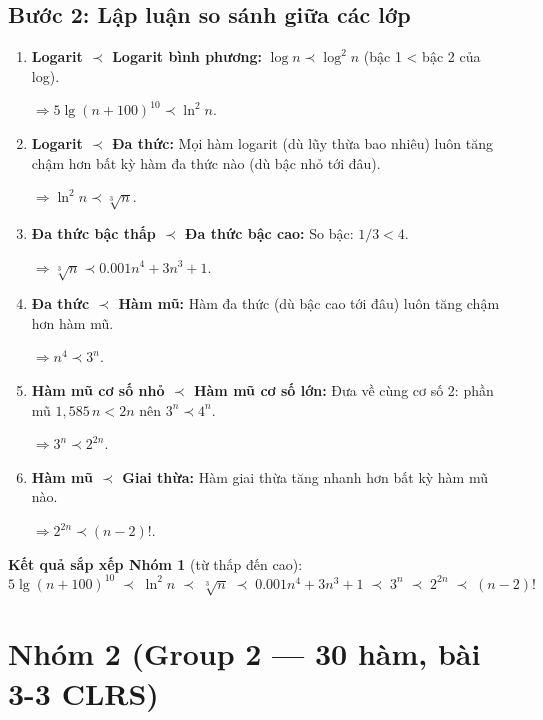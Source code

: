 ﻿\documentclass[12pt,a4paper]{article}
\begin{document}
\subsection{Bước 2: Lập luận so sánh giữa các lớp}

\begin{enumerate}[label=\textbf{(\alph*)}]
  \item \textbf{Logarit $\prec$ Logarit bình phương:}
    $\log n \prec \log^2 n$ (bậc 1 < bậc 2 của log).

    $\Rightarrow 5\lg(n+100)^{10} \prec \ln^2 n$.

  \item \textbf{Logarit $\prec$ Đa thức:}
    Mọi hàm logarit (dù lũy thừa bao nhiêu) luôn tăng chậm hơn bất kỳ hàm đa thức nào (dù bậc nhỏ tới đâu).

    $\Rightarrow \ln^2 n \prec \sqrt[3]{n}$.

  \item \textbf{Đa thức bậc thấp $\prec$ Đa thức bậc cao:}
    So bậc: $1/3 < 4$.

    $\Rightarrow \sqrt[3]{n} \prec 0.001n^4 + 3n^3 + 1$.

  \item \textbf{Đa thức $\prec$ Hàm mũ:}
    Hàm đa thức (dù bậc cao tới đâu) luôn tăng chậm hơn hàm mũ.

    $\Rightarrow n^4 \prec 3^n$.

  \item \textbf{Hàm mũ cơ số nhỏ $\prec$ Hàm mũ cơ số lớn:}
    Đưa về cùng cơ số 2: phần mũ $1{,}585\,n < 2n$ nên $3^n \prec 4^n$.

    $\Rightarrow 3^n \prec 2^{2n}$.

  \item \textbf{Hàm mũ $\prec$ Giai thừa:}
    Hàm giai thừa tăng nhanh hơn bất kỳ hàm mũ nào.

    $\Rightarrow 2^{2n} \prec (n-2)!$.
\end{enumerate}

\begin{resultbox}
\textbf{Kết quả sắp xếp Nhóm 1} (từ thấp đến cao):
\[
  \boxed{
    5\lg(n+100)^{10}
    \;\prec\; \ln^2 n
    \;\prec\; \sqrt[3]{n}
    \;\prec\; 0.001n^4 + 3n^3 + 1
    \;\prec\; 3^n
    \;\prec\; 2^{2n}
    \;\prec\; (n-2)!
  }
\]
\end{resultbox}

\newpage
\section{Nhóm 2 (Group 2 --- 30 hàm, bài 3-3 CLRS)}
\end{document}
